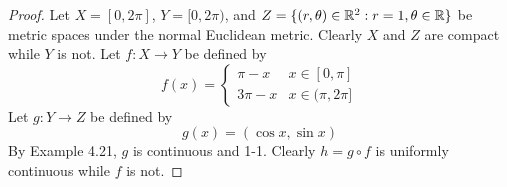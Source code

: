 \documentclass[../psets.tex]{subfiles}
\begin{document}
\begin{enumerate}[label={\textbf{\arabic*.}}]
\begin{proof}
        Let $X=[0,2\pi]$, $Y=[0,2\pi)$, and $Z=\{(r,\theta)\in\mathbb{R}^2:r=1,\theta\in\mathbb{R}\}$ be metric spaces under the normal Euclidean metric. Clearly $X$ and $Z$ are compact while $Y$ is not. Let $f:X\to Y$ be defined by
        \begin{equation*}
            f(x) =
            \begin{cases}
                \pi-x & x\in[0,\pi]\\
                3\pi-x & x\in(\pi,2\pi]
            \end{cases}
        \end{equation*}
        Let $g:Y\to Z$ be defined by
        \begin{equation*}
            g(x) = (\cos x,\sin x)
        \end{equation*}
        By Example 4.21, $g$ is continuous and 1-1. Clearly $h=g\circ f$ is uniformly continuous while $f$ is not.
    \end{proof}
\end{enumerate}
\end{document}
